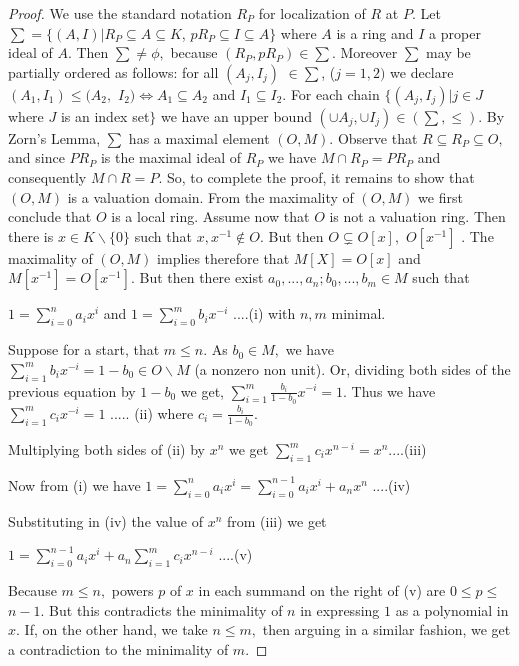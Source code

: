 \documentclass{amsproc}
\theoremstyle{plain}
\numberwithin{equation}{section}
\begin{document}
\begin{proof}
We use the standard notation $R_{P}$ for localization of $R$ at $P.$ Let $%
\sum =\{(A,I)|R_{P}\subseteq A\subseteq K$, $pR_{P}\subseteq I\subseteq A\}$
where $A$ is a ring and $I$ a proper ideal of $A$. Then $\sum \neq \phi ,$
because $(R_{P},pR_{P})\in \sum .$ Moreover $\sum $ may be partially ordered
as follows: for all $(A_{j},I_{j})$ $\in \sum $, ($j=1,2)$ we declare $%
(A_{1},I_{1})\leq (A_{2},$ $I_{2})\Leftrightarrow A_{1}\subseteq A_{2}$ and $%
I_{1}\subseteq I_{2}.$ For each chain $\{(A_{j},I_{j})|j\in J$ where $J$ is
an index set$\}$ we have an upper bound $(\cup A_{j},\cup I_{j})\in (\sum
,\leq ).$ By Zorn's Lemma, $\sum $ has a maximal element $(O,M).$ Observe
that $R\subseteq R_{P}\subseteq O,$ and since $PR_{P}$ is the maximal ideal
of $R_{P}$ we have $M\cap R_{P}=PR_{P}$ and consequently $M\cap R=P.$ So, to
complete the proof, it remains to show that $(O,M)$ is a valuation domain.
From the maximality of $(O,M)$ we first conclude that $O$ is a local ring.
Assume now that $O$ is not a valuation ring. Then there is $x\in K\backslash
\{0\}$ such that $x,x^{-1}\notin O.$ But then $O\subsetneq O[x],$ $O[x^{-1}]$%
. The maximality of $(O,M)$ implies therefore that $M[X]=O[x]$ and $%
M[x^{-1}]=O[x^{-1}].$ But then there exist $a_{0},...,a_{n};b_{0},...,b_{m}%
\in M$ such that

$1=\sum_{i=0}^{n}a_{i}x^{i}$ and $1=\sum_{i=0}^{m}b_{i}x^{-i}$ ....(i) with $%
n,m$ minimal.

Suppose for a start, that $m\leq n.$ As $b_{0}\in M,$ we have $%
\sum_{i=1}^{m}b_{i}x^{-i}=1-b_{0}\in O\backslash M$ (a nonzero non unit).
Or, dividing both sides of the previous equation by $1-b_{0}$ we get, $%
\sum_{i=1}^{m}\frac{b_{i}}{1-b_{0}}x^{-i}=1$. Thus we have $%
\sum_{i=1}^{m}c_{i}x^{-i}=1$ ..... (ii) where $c_{i}=\frac{b_{i}}{1-b_{0}}.$

Multiplying both sides of (ii) by $x^{n}$ we get $%
\sum_{i=1}^{m}c_{i}x^{n-i}=x^{n}$....(iii)

Now from (i) we have $1=\sum_{i=0}^{n}a_{i}x^{i}=%
\sum_{i=0}^{n-1}a_{i}x^{i}+a_{n}x^{n}$ ....(iv)

Substituting in (iv) the value of $x^{n}$ from (iii) we get

$1=\sum_{i=0}^{n-1}a_{i}x^{i}+a_{n}\sum_{i=1}^{m}c_{i}x^{n-i}$ ....(v)

Because $m\leq n,$ powers $p$ of $x$ in each summand on the right of (v) are 
$0\leq p\leq $ $n-1.$ But this contradicts the minimality of $n$ in
expressing $1$ as a polynomial in $x.$ If, on the other hand, we take $n\leq
m,$ then arguing in a similar fashion, we get a contradiction to the
minimality of $m.$
\end{proof}
\end{document}
